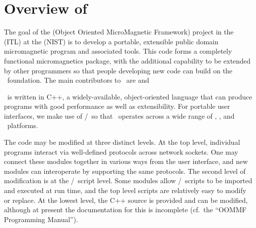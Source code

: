 \section{Overview of \OOMMF}\label{sec:overview}
The goal of the
 (Object
Oriented MicroMagnetic Framework) project in the
 (ITL) at the
 (NIST)
is to develop a portable, extensible public domain micromagnetic
program and associated tools.  This code forms a completely
functional micromagnetics package, with the additional capability to
be extended by other programmers so that people developing
new code can build on the \OOMMF\ foundation.
The main
contributors to \OOMMF\ are
and

\OOMMF\ is written in C++, a widely-available, object-oriented language
that can produce programs with good performance as well as extensibility.
For portable user interfaces, we make use of \Tcl/\Tk\ so that \OOMMF\ 
operates across a wide range of \Unix, \Windows, and \MacOSX\ platforms.

The code may be modified at three distinct levels.  At the top level,
individual programs interact via well-defined protocols across network
sockets\index{network~socket}.  One may connect these modules together
in various ways from the user interface, and new modules can interoperate
by supporting the same protocols.  The second level of
modification is at the \Tcl/\Tk\ script level.  Some modules allow
\Tcl/\Tk\ scripts to be imported and executed at run time, and the top
level scripts are relatively easy to modify or replace.  At the lowest
level, the C++ source is provided and can be modified, although at
present the documentation for this is incomplete (cf.\ the ``OOMMF
Programming Manual'').


